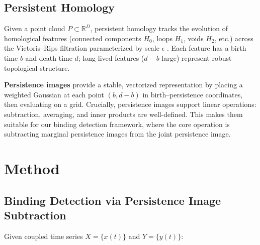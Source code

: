 \documentclass[11pt,a4paper]{article}
\begin{document}
\subsection{Persistent Homology}

Given a point cloud $P \subset \mathbb{R}^D$, persistent homology tracks the evolution of homological features (connected components $H_0$, loops $H_1$, voids $H_2$, etc.) across the Vietoris--Rips filtration parameterized by scale $\epsilon$ \citep{edelsbrunner2010computational}.
Each feature has a birth time $b$ and death time $d$; long-lived features ($d - b$ large) represent robust topological structure.

\textbf{Persistence images} \citep{adams2017persistence} provide a stable, vectorized representation by placing a weighted Gaussian at each point $(b, d-b)$ in birth--persistence coordinates, then evaluating on a grid.
Crucially, persistence images support linear operations: subtraction, averaging, and inner products are well-defined.
This makes them suitable for our binding detection framework, where the core operation is subtracting marginal persistence images from the joint persistence image.


\section{Method}\label{sec:method}

\subsection{Binding Detection via Persistence Image Subtraction}\label{sec:binding}

Given coupled time series $X = \{x(t)\}$ and $Y = \{y(t)\}$:
\end{document}
